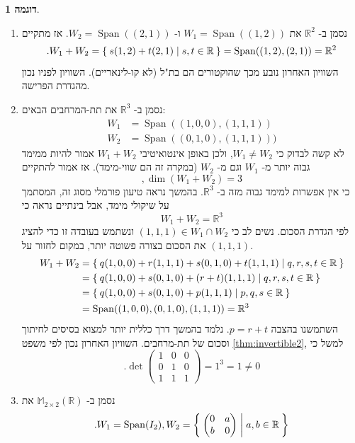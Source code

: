 \documentclass[12pt]{report}
\theoremstyle{plain}
\theoremstyle{definition}
\newtheorem{example}{דוגמה}[chapter]
\newcommand{\R}{\mathbb{R}}
\newcommand{\M}{\mathbb{M}}
\newcommand{\0}{\mathbf{0}}
\DeclareMathOperator{\Span}{Span}
\begin{document}
\begin{example}\
\begin{enumerate}[label=\alph*.]
\item 
נסמן ב-
$\R^2$
את
$W_1=\Span((1,2))$
ו-
$W_2=\Span((2,1))$.
אז מתקיים
$$
.W_1+W_2=\Set{s(1,2)+t(2,1)|s,t\in\R}=\Span((1,2),(2,1))=\R^2
$$
השוויון האחרון נובע מכך שהוקטורים הם בת"ל (לא קו-לינאריים). השוויון לפניו נכון מהגדרת הפרישה.

\item 
נסמן
ב-
$\R^3$
את תת-המרחבים הבאים:
$$
\begin{aligned}
W_1&=\Span((1,0,0),(1,1,1)) \\
W_2&=\Span((0,1,0),(1,1,1)))
\end{aligned}
$$
לא קשה לבדוק כי 
$W_1\neq W_2$,
ולכן באופן אינטואיטיבי 
$W_1+W_2$
אמור להיות ממימד גבוה יותר מ-
$W_1$
וגם מ-
$W_2$
(במקרה זה הם שווי-מימד).
אז אמור להתקיים 
$$,\dim(W_1+W_2)=3$$
כי אין אפשרות למימד גבוה מזה ב-
$\R^3$.
בהמשך נראה טיעון פורמלי מסוג זה, המסתמך על שיקולי מימד, אבל בינתיים נראה כי
$$W_1+W_2=\R^3$$
לפי הגדרת הסכום. נשים לב כי 
$(1,1,1)\in W_1\cap W_2$
ונשתמש בעובדה זו כדי להציג את הסכום בצורה פשוטה יותר, במקום לחזור על 
$(1,1,1)$.
$$
\begin{aligned}
W_1+W_2&=\Set{q(1,0,0)+r(1,1,1)+s(0,1,0)+t(1,1,1)|q,r,s,t\in\R} \\
&=\Set{q(1,0,0)+s(0,1,0)+(r+t)(1,1,1)|q,r,s,t\in\R} \\
&=\Set{q(1,0,0)+s(0,1,0)+p(1,1,1)|p,q,s\in\R} \\
&=\Span((1,0,0),(0,1,0),(1,1,1))=\R^3
\end{aligned}
$$
השתמשנו בהצבה 
$p=r+t$.
נלמד בהמשך דרך כללית יותר למצוא בסיסים לחיתוך וסכום של תת-מרחבים. 
השוויון האחרון נכון לפי משפט
\ref{thm:invertible2},
למשל כי
$$
.\det\begin{pmatrix}
1 & 0 & 0 \\
0 & 1 & 0 \\
1 & 1 & 1
\end{pmatrix}=1^3=1\neq 0
$$


\item
נסמן ב-
$\M_{2\times 2}(\R)$
את
$$
.W_1=\Span(I_2), W_2=\Set{\begin{pmatrix}
0 & a \\
b & 0
\end{pmatrix}|a,b\in\R
}
$$


\end{enumerate}
\end{example}
\end{document}
